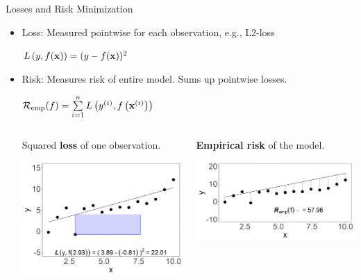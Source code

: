 \documentclass[11pt,compress,t,notes=noshow, xcolor=table]{beamer}
\begin{document}
\begin{vbframe}{Losses and Risk Minimization}

\begin{itemize}
\item Loss: Measured pointwise for each observation, e.g., L2-loss 
\begin{center}
$L\left(y, f(\mathbf{x})\right) = (y - f(\mathbf{x}))^2$
\end{center}
\item Risk: Measures risk of entire model. Sums up pointwise losses.
\begin{center}
$ \mathcal{R}_{\text{emp}}(f) = \sum\limits_{i=1}^n L\left(y^{(i)}, f\left(\mathbf{x}^{(i)}\right)\right) $
\end{center} 
\hspace{1cm}


\begin{columns}  
\begin{column}{0.5\textwidth} 
\small Squared \textbf{loss} of one observation.

  \begin{center}
    \includegraphics[width=\textwidth]{slides/ml-basics/figure_man/nutshell_ml_basic_1_loss_sqrd.png} 
  \end{center}
\end{column}  


\begin{column}{0.48\textwidth} 
\small \textbf{Empirical risk} of the model.

  \begin{center}
    \includegraphics[width=\textwidth]{slides/ml-basics/figure_man/nutshell-ml-basic-2-risk.png} 
  \end{center}
\end{column} 
\end{columns}
\end{itemize}


\end{vbframe}
\end{document}
